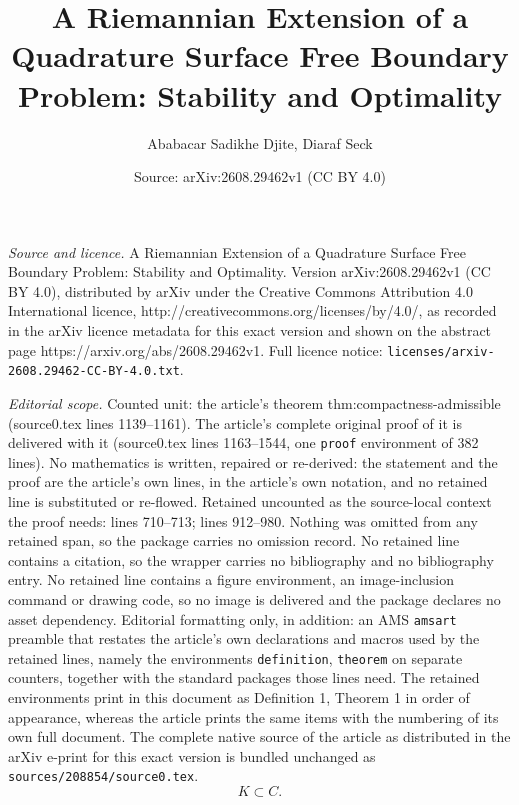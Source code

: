 \documentclass[10pt,a4paper]{amsart}
\title{A Riemannian Extension of a Quadrature Surface Free Boundary Problem: Stability and Optimality}
\author{Ababacar Sadikhe Djite, Diaraf Seck}
\date{Source: arXiv:2608.29462v1 (CC BY 4.0)}
\begin{document}
\maketitle

\noindent\emph{Source and licence.} A Riemannian Extension of a Quadrature Surface Free Boundary Problem: Stability and Optimality. Version arXiv:2608.29462v1 (CC BY 4.0), distributed by arXiv under the Creative Commons Attribution 4.0 International licence, http://creativecommons.org/licenses/by/4.0/, as recorded in the arXiv licence metadata for this exact version and shown on the abstract page https://arxiv.org/abs/2608.29462v1. Full licence notice: \texttt{licenses/arxiv-2608.29462-CC-BY-4.0.txt}.\par\smallskip

\noindent\textit{Editorial scope.} Counted unit: the article's theorem thm:compactness-admissible (source0.tex lines 1139--1161). The article's complete original proof of it is delivered with it (source0.tex lines 1163--1544, one \texttt{proof} environment of 382 lines). No mathematics is written, repaired or re-derived: the statement and the proof are the article's own lines, in the article's own notation, and no retained line is substituted or re-flowed.  Retained uncounted as the source-local context the proof needs: lines 710--713; lines 912--980.  Nothing was omitted from any retained span, so the package carries no omission record.  No retained line contains a citation, so the wrapper carries no bibliography and no bibliography entry.  No retained line contains a figure environment, an image-inclusion command or drawing code, so no image is delivered and the package declares no asset dependency.  Editorial formatting only, in addition: an AMS \texttt{amsart} preamble that restates the article's own declarations and macros used by the retained lines, namely the environments \texttt{definition}, \texttt{theorem} on separate counters, together with the standard packages those lines need.  The retained environments print in this document as Definition 1, Theorem 1 in order of appearance, whereas the article prints the same items with the numbering of its own full document.  The complete native source of the article as distributed in the arXiv e-print for this exact version is bundled unchanged as \texttt{sources/208854/source0.tex}.
\begin{equation}
K\subset C.
\label{eq:K-compact-C}
\end{equation}
\end{document}
